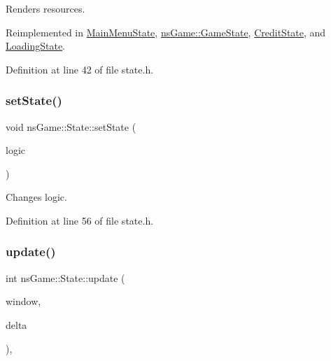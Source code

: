 Renders resources. 



Reimplemented in \hyperlink{class_main_menu_state_a1f11855f3b961e7a71c7c4e16f0b3478}{Main\+Menu\+State}, \hyperlink{classns_game_1_1_game_state_a1e3179b016431332ecff880e09e267d3}{ns\+Game\+::\+Game\+State}, \hyperlink{class_credit_state_aa4ba316fca29d0e79ee70891e373a060}{Credit\+State}, and \hyperlink{class_loading_state_a64812e3f15d84b60ab8313509ba07520}{Loading\+State}.



Definition at line 42 of file state.\+h.

\mbox{\label{classns_game_1_1_state_adab442cc7a1edda5adaa55e8d510633f}} 
\subsubsection{\texorpdfstring{set\+State()}{setState()}}
{\footnotesize\ttfamily void ns\+Game\+::\+State\+::set\+State (\begin{DoxyParamCaption}\item[{int}]{logic }\end{DoxyParamCaption})\hspace{0.3cm}{\ttfamily [inline]}}



Changes logic. 



Definition at line 56 of file state.\+h.

\mbox{\label{classns_game_1_1_state_ae809e89ac9df4a43ab90d5d5932e2bc7}} 
\subsubsection{\texorpdfstring{update()}{update()}}
{\footnotesize\ttfamily int ns\+Game\+::\+State\+::update (\begin{DoxyParamCaption}\item[{Min\+GL \&}]{window,  }\item[{unsigned}]{delta }\end{DoxyParamCaption})\hspace{0.3cm}{\ttfamily [inline]}, {\ttfamily [virtual]}}



